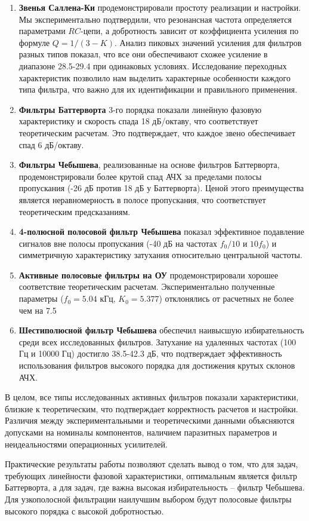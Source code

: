 \begin{enumerate}
    \item \textbf{Звенья Саллена-Ки} продемонстрировали простоту реализации и настройки. Мы экспериментально подтвердили, что резонансная частота определяется параметрами $RC$-цепи, а добротность зависит от коэффициента усиления по формуле $Q = 1/(3 - K)$. Анализ пиковых значений усиления для фильтров разных типов показал, что все они обеспечивают схожее усиление в диапазоне 28.5-29.4 при одинаковых условиях. Исследование переходных характеристик позволило нам выделить характерные особенности каждого типа фильтра, что важно для их идентификации и правильного применения.
    
    \item \textbf{Фильтры Баттерворта} 3-го порядка показали линейную фазовую характеристику и скорость спада 18 дБ/октаву, что соответствует теоретическим расчетам. Это подтверждает, что каждое звено обеспечивает спад 6 дБ/октаву.
    
    \item \textbf{Фильтры Чебышева}, реализованные на основе фильтров Баттерворта, продемонстрировали более крутой спад АЧХ за пределами полосы пропускания (-26 дБ против 18 дБ у Баттерворта). Ценой этого преимущества является неравномерность в полосе пропускания, что соответствует теоретическим предсказаниям.
    
    \item \textbf{4-полюсной полосовой фильтр Чебышева} показал эффективное подавление сигналов вне полосы пропускания (-40 дБ на частотах $f_0/10$ и $10f_0$) и симметричную характеристику затухания относительно центральной частоты.
    
    \item \textbf{Активные полосовые фильтры на ОУ} продемонстрировали хорошее соответствие теоретическим расчетам. Экспериментально полученные параметры ($f_0 = 5.04$ кГц, $K_0 = 5.377$) отклонялись от расчетных не более чем на 7.5%
    
    \item \textbf{Шестиполюсной фильтр Чебышева} обеспечил наивысшую избирательность среди всех исследованных фильтров. Затухание на удаленных частотах (100 Гц и 10000 Гц) достигло 38.5-42.3 дБ, что подтверждает эффективность использования фильтров высокого порядка для достижения крутых склонов АЧХ.
\end{enumerate}

В целом, все типы исследованных активных фильтров показали характеристики, близкие к теоретическим, что подтверждает корректность расчетов и настройки. Различия между экспериментальными и теоретическими данными объясняются допусками на номиналы компонентов, наличием паразитных параметров и неидеальностями операционных усилителей. 

Практические результаты работы позволяют сделать вывод о том, что для задач, требующих линейности фазовой характеристики, оптимальным является фильтр Баттерворта, а для задач, где важна высокая избирательность – фильтр Чебышева. Для узкополосной фильтрации наилучшим выбором будут полосовые фильтры высокого порядка с высокой добротностью.
